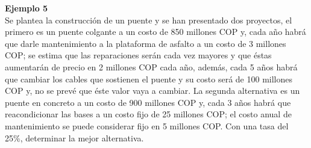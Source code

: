 \textbf{Ejemplo 5}\\
Se plantea la construcción de un puente y se han presentado dos proyectos, el primero es un puente colgante a un costo de 850 millones COP y, cada año habrá que darle mantenimiento a la plataforma de asfalto a un costo de 3 millones COP; se estima que las reparaciones serán cada vez mayores y que éstas aumentarán de precio en 2 millones COP cada año, además, cada 5 años habrá que cambiar los cables que sostienen el puente y su costo será de 100 millones COP y, no se prevé que éste valor vaya a cambiar. La segunda alternativa es un puente en concreto a un costo de 900 millones COP y, cada 3 años habrá que reacondicionar las bases a un costo fijo de 25 millones COP; el costo anual de mantenimiento se puede considerar fijo en 5 millones COP. Con una tasa del 25\%, determinar la mejor alternativa.\\



